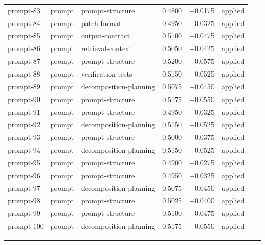 \begin{center}
\begin{longtable}{llp{5.2cm}rrl}
prompt-83 & prompt & prompt-structure & 0.4800 & +0.0175 & applied \\
prompt-84 & prompt & patch-format & 0.4950 & +0.0325 & applied \\
prompt-85 & prompt & output-contract & 0.5100 & +0.0475 & applied \\
prompt-86 & prompt & retrieval-context & 0.5050 & +0.0425 & applied \\
prompt-87 & prompt & prompt-structure & 0.5200 & +0.0575 & applied \\
prompt-88 & prompt & verification-tests & 0.5150 & +0.0525 & applied \\
prompt-89 & prompt & decomposition-planning & 0.5075 & +0.0450 & applied \\
prompt-90 & prompt & prompt-structure & 0.5175 & +0.0550 & applied \\
prompt-91 & prompt & prompt-structure & 0.4950 & +0.0325 & applied \\
prompt-92 & prompt & decomposition-planning & 0.5150 & +0.0525 & applied \\
prompt-93 & prompt & prompt-structure & 0.5000 & +0.0375 & applied \\
prompt-94 & prompt & decomposition-planning & 0.5150 & +0.0525 & applied \\
prompt-95 & prompt & prompt-structure & 0.4900 & +0.0275 & applied \\
prompt-96 & prompt & prompt-structure & 0.4950 & +0.0325 & applied \\
prompt-97 & prompt & decomposition-planning & 0.5075 & +0.0450 & applied \\
prompt-98 & prompt & prompt-structure & 0.5025 & +0.0400 & applied \\
prompt-99 & prompt & prompt-structure & 0.5100 & +0.0475 & applied \\
prompt-100 & prompt & decomposition-planning & 0.5175 & +0.0550 & applied \\
\bottomrule\end{longtable}\end{center}
\par\bigskip\hrule\bigskip
